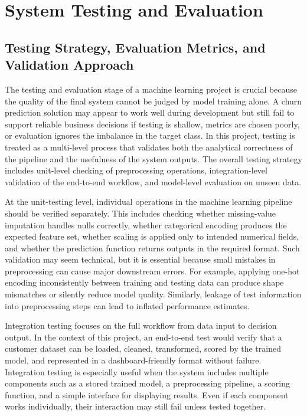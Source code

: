 \chapter{System Testing and Evaluation}

\section{Testing Strategy, Evaluation Metrics, and Validation Approach}
The testing and evaluation stage of a machine learning project is crucial because the quality of the final system cannot be judged by model training alone. A churn prediction solution may appear to work well during development but still fail to support reliable business decisions if testing is shallow, metrics are chosen poorly, or evaluation ignores the imbalance in the target class. In this project, testing is treated as a multi-level process that validates both the analytical correctness of the pipeline and the usefulness of the system outputs. The overall testing strategy includes unit-level checking of preprocessing operations, integration-level validation of the end-to-end workflow, and model-level evaluation on unseen data.

At the unit-testing level, individual operations in the machine learning pipeline should be verified separately. This includes checking whether missing-value imputation handles nulls correctly, whether categorical encoding produces the expected feature set, whether scaling is applied only to intended numerical fields, and whether the prediction function returns outputs in the required format. Such validation may seem technical, but it is essential because small mistakes in preprocessing can cause major downstream errors. For example, applying one-hot encoding inconsistently between training and testing data can produce shape mismatches or silently reduce model quality. Similarly, leakage of test information into preprocessing steps can lead to inflated performance estimates.

Integration testing focuses on the full workflow from data input to decision output. In the context of this project, an end-to-end test would verify that a customer dataset can be loaded, cleaned, transformed, scored by the trained model, and represented in a dashboard-friendly format without failure. Integration testing is especially useful when the system includes multiple components such as a stored trained model, a preprocessing pipeline, a scoring function, and a simple interface for displaying results. Even if each component works individually, their interaction may still fail unless tested together.

